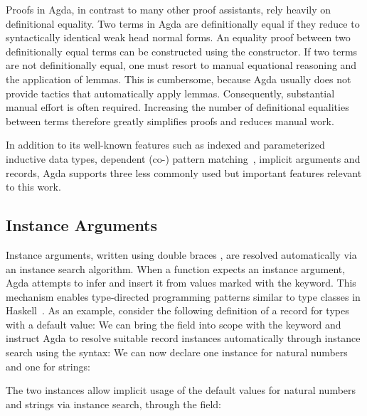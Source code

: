 \documentclass[screen,nonacm]{acmart}
\begin{document}
Proofs in Agda, in contrast to many other proof assistants, rely heavily on
definitional equality. Two terms in Agda are definitionally equal if they
reduce to syntactically identical weak head normal forms. An equality proof
between two definitionally equal terms can be constructed using the
 constructor. If two terms are not
definitionally equal, one must resort to manual equational reasoning and the
application of lemmas. This is cumbersome, because Agda usually does not
provide tactics that automatically apply lemmas. Consequently, substantial
manual effort is often required. Increasing the number of definitional
equalities between terms therefore greatly simplifies proofs and reduces manual
work.

In addition to its well-known features such as indexed and parameterized
inductive data types, dependent (co-) pattern matching~\cite{10.1145/3236770},
implicit arguments and records, Agda supports three less commonly used but
important features relevant to this work.

\subsection*{Instance Arguments}
Instance arguments, written using double braces \AgdaSymbol{\{\{\dots\}\}}, are
resolved automatically via an instance search algorithm. When a function
expects an instance argument, Agda attempts to infer and insert it from values
marked with the  keyword. This mechanism enables
type-directed programming patterns similar to type classes in
Haskell~\cite{10.1145/75277.75283}. As an example, consider the following
definition of a record for types with a default value: \EDefault{}We can bring
the  field into scope with the  keyword
and instruct Agda to resolve suitable record instances automatically through
instance search using the \AgdaSymbol{\{\{\dots\}\}} syntax: \EDefFields{}We
can now declare one instance for natural numbers and one for strings:

\noindent\begin{minipage}[t]{0.48\linewidth}
      \raggedright{}
      \EDefInst{}
\end{minipage}
\begin{minipage}[t]{0.48\linewidth}
      \raggedright{}
      \EDefInstS{}
\end{minipage}

\noindent The two instances allow implicit usage of the default values for natural numbers and strings via instance search, through the  field:
\end{document}

